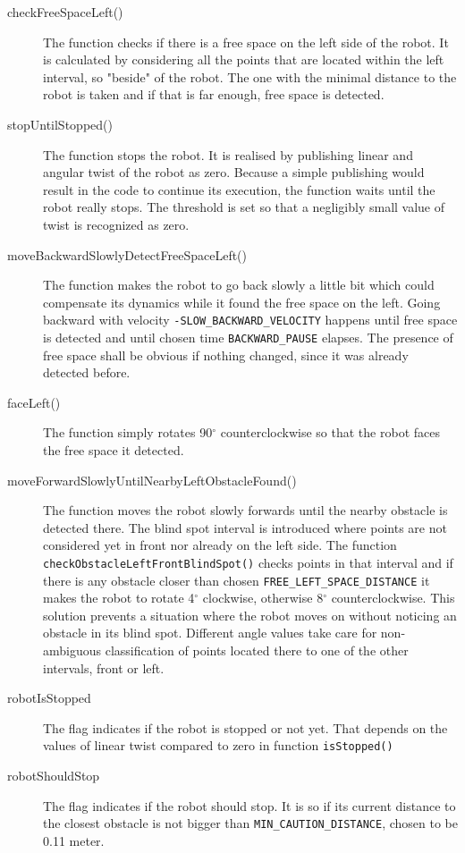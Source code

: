 \begin{description}
\item[checkFreeSpaceLeft()] The function checks if there is a free space on the left side of the robot. It is calculated by considering all the points that are located within the left interval, so "beside" of the robot. The one with the minimal distance to the robot is taken and if that is far enough, free space is detected.
\item[stopUntilStopped()] The function stops the robot. It is realised by publishing linear and angular twist of the robot as zero. Because a simple publishing would result in the code to continue its execution, the function waits until the robot really stops. The threshold is set so that a negligibly small value of twist is recognized as zero.
\item[moveBackwardSlowlyDetectFreeSpaceLeft()] The function makes the robot to go back slowly a little bit which could compensate its dynamics while it found the free space on the left. Going backward with velocity  \texttt{-SLOW\_BACKWARD\_VELOCITY} happens until free space is detected and until chosen time \texttt{BACKWARD\_PAUSE} elapses. The presence of free space shall be obvious if nothing changed, since it was already detected before.
\item[faceLeft()] The function simply rotates 90$^{\circ}$ counterclockwise so that the robot faces the free space it detected.
\item[moveForwardSlowlyUntilNearbyLeftObstacleFound()] The function moves the robot slowly forwards until the nearby obstacle is detected there. The blind spot interval is introduced where points are not considered yet in front nor already on the left side. The function \texttt{checkObstacleLeftFrontBlindSpot()} checks points in that interval and if there is any obstacle closer than chosen \texttt{FREE\_LEFT\_SPACE\_DISTANCE} it makes the robot to rotate 4$^{\circ}$ clockwise, otherwise 8$^{\circ}$ counterclockwise. This solution prevents a situation where the robot moves on without noticing an obstacle in its blind spot. Different angle values take care for non-ambiguous classification of points located there to one of the other intervals, front or left.
\item[robotIsStopped] The flag indicates if the robot is stopped or not yet. That depends on the values of linear twist compared to zero in function \texttt{isStopped()}
\item[robotShouldStop] The flag indicates if the robot should stop. It is so if its current distance to the closest obstacle is not bigger than \texttt{MIN\_CAUTION\_DISTANCE}, chosen to be 0.11 meter.

\end{description}
